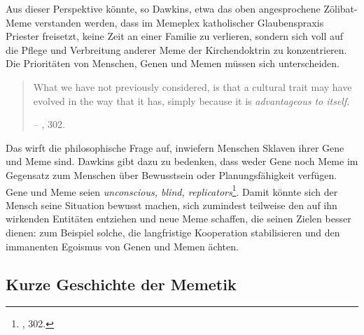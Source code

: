 \documentclass[openany,twoside,twocolumn]{book}
\let\rmarkdownfootnote\footnote%
\def\footnote{\protect\rmarkdownfootnote}
\begin{document}
Aus dieser Perspektive könnte, so Dawkins, etwa das oben angesprochene
Zölibat-Meme verstanden werden, dass im Memeplex katholischer
Glaubenspraxis Priester freisetzt, keine Zeit an einer Familie zu
verlieren, sondern sich voll auf die Pflege und Verbreitung anderer Meme
der Kirchendoktrin zu konzentrieren. Die Prioritäten von Menschen, Genen
und Memen müssen sich unterscheiden.

\begin{quote}
What we have not previously considered, is that a cultural trait may
have evolved in the way that it has, simply because it is
\emph{advantageous to itself}.

-- \textcite{Dawkinsselfishgene40th2016}, 302.
\end{quote}

Das wirft die philosophische Frage auf, inwiefern Menschen Sklaven ihrer
Gene und Meme sind. Dawkins gibt dazu zu bedenken, dass weder Gene noch
Meme im Gegensatz zum Menschen über Bewusstsein oder Planungsfähigkeit
verfügen. Gene und Meme seien \emph{unconscious, blind,
replicators}\footnote{\textcite{Dawkinsselfishgene40th2016}, 302.}.
Damit könnte sich der Mensch seine Situation bewusst machen, sich
zumindest teilweise den auf ihn wirkenden Entitäten entziehen und neue
Meme schaffen, die seinen Zielen besser dienen: zum Beispiel solche, die
langfristige Kooperation stabilisieren und den immanenten Egoismus von
Genen und Memen ächten.

\hypertarget{memetics-history}{%
\subsection{Kurze Geschichte der Memetik}\label{memetics-history}}
\end{document}
